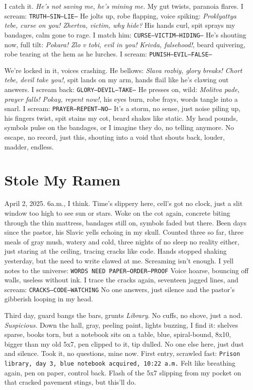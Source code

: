 \documentclass[12pt,oneside]{book} %
\newcommand{\note}[1]{\texttt{#1}}
\begin{document}
I catch it. \textit{He’s not saving me, he’s mining me.} My gut twists, paranoia flares. I scream: \note{TRUTH—SIN—LIE—} He jolts up, robe flapping, voice spiking: \textit{Proklyattya tebe, curse on you! Zhertva, victim, why hide?} His hands curl, spit sprays my bandages, calm gone to rage. I match him: \note{CURSE—VICTIM—HIDING—} He’s shouting now, full tilt: \textit{Pokara! Zlo v tobi, evil in you! Krivda, falsehood!}, beard quivering, robe tearing at the hem as he lurches. I scream: \note{PUNISH—EVIL—FALSE—}

We’re locked in it, voices crashing. He bellows: \textit{Slava rozbiy, glory breaks! Chort tebe, devil take you!}, spit lands on my arm, hands flail like he’s clawing out answers. I scream back: \note{GLORY—DEVIL—TAKE—} He presses on, wild: \textit{Molitva pade, prayer falls! Pokay, repent now!}, his eyes burn, robe frays, words tangle into a snarl. I scream: \note{PRAYER—REPENT—NO—} It’s a storm, no sense, just noise piling up, his fingers twist, spit stains my cot, beard shakes like static. My head pounds, symbols pulse on the bandages, or I imagine they do, no telling anymore. No escape, no record, just this, shouting into a void that shouts back, louder, madder, endless.

\chapter{Stole My Ramen}

April 2, 2025. 6a.m., I think. Time’s slippery here, cell’s got no clock, just a slit window too high to see sun or stars. Woke on the cot again, concrete biting through the thin mattress, bandages still on, symbols faded but there. Been days since the pastor, his Slavic yells echoing in my skull. Counted three so far, three meals of gray mush, watery and cold, three nights of no sleep no reality either, just staring at the ceiling, tracing cracks like code. Hands stopped shaking yesterday, but the need to write clawed at me.  Screaming isn’t enough. I yell notes to the universe: \note{WORDS NEED PAPER—ORDER—PROOF} Voice hoarse, bouncing off walls, useless without ink. I trace the cracks again, seventeen jagged lines, and scream: \note{CRACKS—CODE—WATCHING} No one answers, just silence and the pastor’s gibberish looping in my head.

Third day, guard bangs the bars, grunts \textit{Library}. No cuffs, no shove, just a nod. \textit{Suspicious.} Down the hall, gray, peeling paint, lights buzzing, I find it: shelves sparse, books torn, but a notebook sits on a table, blue, spiral-bound, 8x10, bigger than my old 5x7, pen clipped to it, tip dulled. No one else here, just dust and silence. Took it, no questions, mine now. First entry, scrawled fast: \note{Prison library, day 3, blue notebook acquired, 10:22 a.m.} Felt like breathing again, pen on paper, control back. Flash of the 5x7 slipping from my pocket on that cracked pavement stings, but this’ll do.
\end{document}
